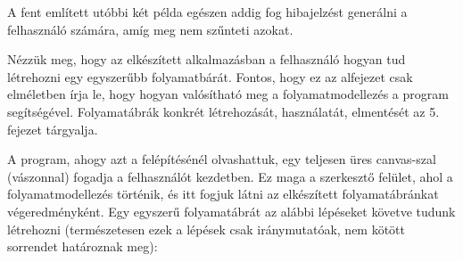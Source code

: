 A fent említett utóbbi két példa egészen addig fog hibajelzést generálni a felhasználó számára, amíg meg nem szűnteti azokat.


Nézzük meg, hogy az elkészített alkalmazásban a felhasználó hogyan tud létrehozni egy egyszerűbb folyamatbárát. Fontos, hogy ez az alfejezet csak elméletben írja le, hogy hogyan valósítható meg a folyamatmodellezés a program segítségével. Folyamatábrák konkrét létrehozását, használatát, elmentését az 5. fejezet tárgyalja.

A program, ahogy azt a felépítésénél olvashattuk, egy teljesen üres canvas-szal (vászonnal) fogadja a felhasználót kezdetben. Ez maga a szerkesztő felület, ahol a folyamatmodellezés történik, és itt fogjuk látni az elkészített folyamatábránkat végeredményként. Egy egyszerű folyamatábrát az alábbi lépéseket követve tudunk létrehozni (természetesen ezek a lépések csak iránymutatóak, nem kötött sorrendet határoznak meg):

